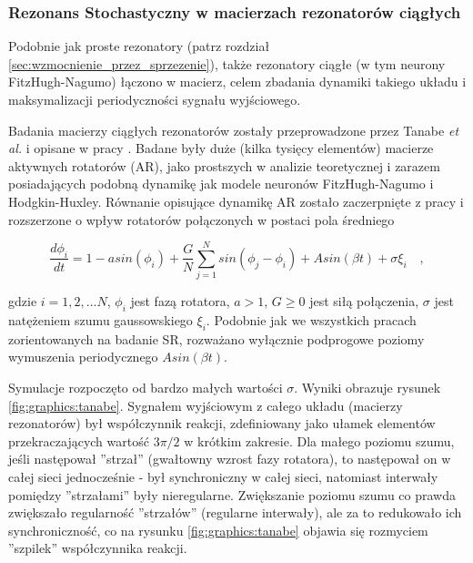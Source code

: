 


  \subsubsection{Rezonans Stochastyczny w macierzach rezonatorów ciągłych}

  Podobnie jak proste rezonatory (patrz rozdział \ref{sec:wzmocnienie_przez_sprzezenie}), także rezonatory ciągłe (w tym neurony FitzHugh-Nagumo) łączono w macierz, celem zbadania dynamiki takiego układu i maksymalizacji periodyczności sygnału wyjściowego. 

  Badania macierzy ciągłych rezonatorów zostały przeprowadzone przez Tanabe \emph{et al.} i opisane w pracy \cite{tanabe_shimokawa}. Badane były duże (kilka tysięcy elementów) macierze aktywnych rotatorów (AR), jako prostszych w analizie teoretycznej i zarazem posiadających podobną dynamikę jak modele neuronów FitzHugh-Nagumo i Hodgkin-Huxley. Równanie opisujące dynamikę AR zostało zaczerpnięte z pracy \cite{shinomoto} i rozszerzone o wpływ rotatorów połączonych w postaci pola średniego

  \begin{equation}
    \frac{d \phi_i}{dt} = 1 - a sin(\phi_i) + \frac{G}{N} \sum\limits_{j=1}^{N} sin(\phi_j - \phi_i) + A sin(\beta t) + \sigma \xi_i \quad ,
  \end{equation}

  gdzie $i=1,2,...N$, $\phi_i$ jest fazą rotatora, $a > 1$, $G \ge 0$ jest siłą połączenia, $\sigma$ jest natężeniem szumu gaussowskiego $\xi_i$. Podobnie jak we wszystkich pracach zorientowanych na badanie SR, rozważano wyłącznie podprogowe poziomy wymuszenia periodycznego $A sin(\beta t)$.

  Symulacje rozpoczęto od bardzo małych wartości $\sigma$. Wyniki obrazuje rysunek \ref{fig:graphics:tanabe}. Sygnałem wyjściowym z całego układu (macierzy rezonatorów) był współczynnik reakcji, zdefiniowany jako ułamek elementów przekraczających wartość $3 \pi / 2$ w krótkim zakresie. Dla małego poziomu szumu, jeśli następował ''strzał'' (gwałtowny wzrost fazy rotatora), to następował on w całej sieci jednocześnie - był synchroniczny w całej sieci, natomiast interwały pomiędzy ''strzałami'' były nieregularne. Zwiększanie poziomu szumu co prawda zwiększało regularność ''strzałów'' (regularne interwały), ale za to redukowało ich synchroniczność, co na rysunku \ref{fig:graphics:tanabe} objawia się rozmyciem ''szpilek'' współczynnika reakcji.


